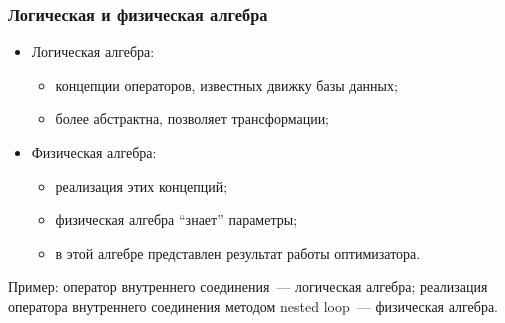 \documentclass{beamer}
\begin{document}
\begin{frame}[allowframebreaks]
\frametitle{Логическая и физическая алгебра}


\begin{itemize}
  \setlength\itemsep{1em}
  \item Логическая алгебра: 
  \begin{itemize}
    \setlength\itemsep{1em}
    \item концепции операторов, известных движку базы данных;
    \item более абстрактна, позволяет трансформации;
  \end{itemize}
  
  \item Физическая алгебра:
  \begin{itemize}
    \setlength\itemsep{1em}
    \item реализация этих концепций;
    \item физическая алгебра ``знает'' параметры;
    \item в этой алгебре представлен результат работы оптимизатора.
  \end{itemize} 
\end{itemize}

Пример: оператор внутреннего соединения~--- логическая алгебра; реализация оператора внутреннего соединения методом nested loop~--- физическая алгебра.

\end{frame}
\end{document}
